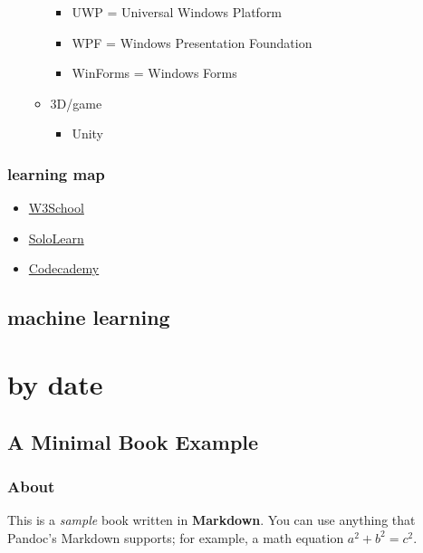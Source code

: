 \documentclass[
]{book}
\providecommand{\tightlist}{%
  \setlength{\itemsep}{0pt}\setlength{\parskip}{0pt}}
\theoremstyle{definition}
\theoremstyle{definition}
\theoremstyle{definition}
\theoremstyle{definition}
\theoremstyle{remark}
\begin{document}
\begin{itemize}
\begin{itemize}
    \begin{itemize}
    \tightlist
    \item
      UWP = Universal Windows Platform
    \item
      WPF = Windows Presentation Foundation
    \item
      WinForms = Windows Forms
    \end{itemize}
  \item
    3D/game

    \begin{itemize}
    \tightlist
    \item
      Unity
    \end{itemize}
  \end{itemize}
\end{itemize}

\section{learning map}\label{learning-map-2}

\begin{itemize}
\tightlist
\item
  \href{https://www.w3schools.com/}{W3School}
\item
  \href{https://www.sololearn.com/}{SoloLearn}
\item
  \href{https://www.codecademy.com/}{Codecademy}
\end{itemize}

\chapter{machine learning}\label{machine-learning}

\part{by date}\label{part-by-date}

\chapter{A Minimal Book Example}\label{a-minimal-book-example}

\section{About}\label{about}

This is a \emph{sample} book written in \textbf{Markdown}. You can use anything that Pandoc's Markdown supports; for example, a math equation \(a^2 + b^2 = c^2\).
\end{document}
